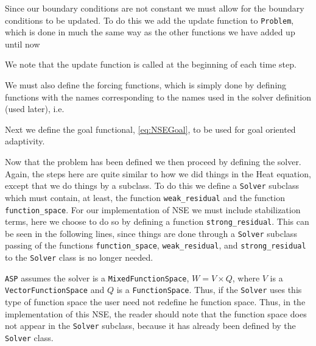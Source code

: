     Since our boundary conditions are not constant we must allow for the
    boundary conditions to be updated. To do this we add the update function to
    \texttt{Problem}, which is done in much the same way as the other functions
    we have added up until now
    

    \begin{remark}
        We note that the update function is called at the beginning
        of each time step.
    \end{remark}

    We must also define the forcing functions, which is simply done by defining
    functions with the names corresponding to the names used in the solver
    definition (used later), i.e.
    

    Next we define the goal functional, \eqref{eq:NSEGoal}, to be used for goal
    oriented adaptivity.
    

    Now that the problem has been defined we then proceed by defining the
    solver. Again, the steps here are quite similar to how we did things in the
    Heat equation, except that we do things by a subclass.  To do this we define
    a \texttt{Solver} subclass which must contain, at least, the function
    \texttt{weak\_residual} and the function \texttt{function\_space}. For our
    implementation of NSE we must include stabilization terms, here we choose to
    do so by defining a function \texttt{strong\_residual}.  This can be seen in
    the following lines, since things are done through a \texttt{Solver}
    subclass passing of the functions \texttt{function\_space},
    \texttt{weak\_residual}, and \texttt{strong\_residual} to the
    \texttt{Solver} class is no longer needed.

    \begin{remark}
        \texttt{ASP} assumes the solver is a \texttt{MixedFunctionSpace}, $W =
        V \times Q$, where $V$ is a \texttt{VectorFunctionSpace} and $Q$ is a
        \texttt{FunctionSpace}. Thus, if the \texttt{Solver} uses this type of
        function space the user need not redefine he function space. Thus, in
        the implementation of this NSE, the reader should note that the function
        space does not appear in the \texttt{Solver} subclass, because it has
        already been defined by the \texttt{Solver} class.
    \end{remark}

